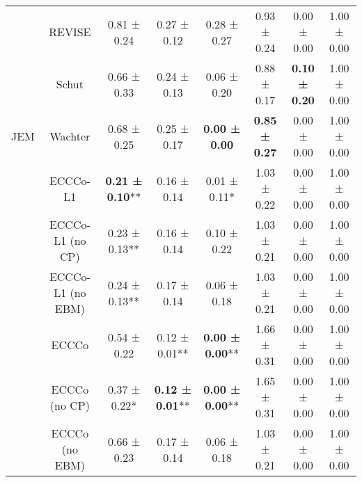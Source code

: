 \begin{table}
{\begin{tabular}[t]{cccccccc}
 & REVISE & 0.81 ± 0.24\hphantom{*}\hphantom{*} & 0.27 ± 0.12\hphantom{*}\hphantom{*} & 0.28 ± 0.27\hphantom{*}\hphantom{*} & 0.93 ± 0.24\hphantom{*}\hphantom{*} & 0.00 ± 0.00\hphantom{*}\hphantom{*} & 1.00 ± 0.00\hphantom{*}\hphantom{*}\\

 & Schut & 0.66 ± 0.33\hphantom{*}\hphantom{*} & 0.24 ± 0.13\hphantom{*}\hphantom{*} & 0.06 ± 0.20\hphantom{*}\hphantom{*} & 0.88 ± 0.17\hphantom{*}\hphantom{*} & \textbf{0.10 ± 0.20}\hphantom{*}\hphantom{*} & 1.00 ± 0.00\hphantom{*}\hphantom{*}\\

\multirow[t]{-9}{*}{\centering\arraybackslash JEM} & Wachter & 0.68 ± 0.25\hphantom{*}\hphantom{*} & 0.25 ± 0.17\hphantom{*}\hphantom{*} & \textbf{0.00 ± 0.00}\hphantom{*}\hphantom{*} & \textbf{0.85 ± 0.27}\hphantom{*}\hphantom{*} & 0.00 ± 0.00\hphantom{*}\hphantom{*} & 1.00 ± 0.00\hphantom{*}\hphantom{*}\\
\cmidrule{1-8}
 & ECCCo-L1 & \textbf{0.21 ± 0.10}** & 0.16 ± 0.14\hphantom{*}\hphantom{*} & 0.01 ± 0.11*\hphantom{*} & 1.03 ± 0.22\hphantom{*}\hphantom{*} & 0.00 ± 0.00\hphantom{*}\hphantom{*} & 1.00 ± 0.00\hphantom{*}\hphantom{*}\\

 & ECCCo-L1 (no CP) & 0.23 ± 0.13** & 0.16 ± 0.14\hphantom{*}\hphantom{*} & 0.10 ± 0.22\hphantom{*}\hphantom{*} & 1.03 ± 0.21\hphantom{*}\hphantom{*} & 0.00 ± 0.00\hphantom{*}\hphantom{*} & 1.00 ± 0.00\hphantom{*}\hphantom{*}\\

 & ECCCo-L1 (no EBM) & 0.24 ± 0.13** & 0.17 ± 0.14\hphantom{*}\hphantom{*} & 0.06 ± 0.18\hphantom{*}\hphantom{*} & 1.03 ± 0.21\hphantom{*}\hphantom{*} & 0.00 ± 0.00\hphantom{*}\hphantom{*} & 1.00 ± 0.00\hphantom{*}\hphantom{*}\\

 & ECCCo & 0.54 ± 0.22\hphantom{*}\hphantom{*} & 0.12 ± 0.01** & \textbf{0.00 ± 0.00}** & 1.66 ± 0.31\hphantom{*}\hphantom{*} & 0.00 ± 0.00\hphantom{*}\hphantom{*} & 1.00 ± 0.00\hphantom{*}\hphantom{*}\\

 & ECCCo (no CP) & 0.37 ± 0.22*\hphantom{*} & \textbf{0.12 ± 0.01}** & \textbf{0.00 ± 0.00}** & 1.65 ± 0.31\hphantom{*}\hphantom{*} & 0.00 ± 0.00\hphantom{*}\hphantom{*} & 1.00 ± 0.00\hphantom{*}\hphantom{*}\\

 & ECCCo (no EBM) & 0.66 ± 0.23\hphantom{*}\hphantom{*} & 0.17 ± 0.14\hphantom{*}\hphantom{*} & 0.06 ± 0.18\hphantom{*}\hphantom{*} & 1.03 ± 0.21\hphantom{*}\hphantom{*} & 0.00 ± 0.00\hphantom{*}\hphantom{*} & 1.00 ± 0.00\hphantom{*}\hphantom{*}\\


\end{tabular}}
\end{table}
